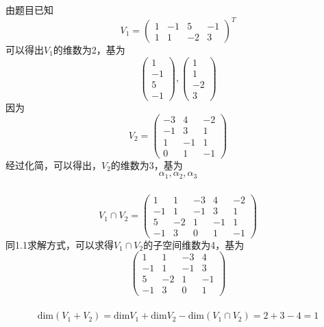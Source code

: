 \documentclass[onecolumn,oneside]{SUSTechHomework}
\begin{document}
  \subsubsection{}
  由题目已知
  \[
    V_1 = \begin{pmatrix} 1 & -1 & 5 & -1 \\ 1 & 1 & -2 & 3\end{pmatrix}^T
  \]
  可以得出\(V_1\)的维数为2，基为
  \[
    \begin{pmatrix} 1 \\ -1 \\ 5 \\ -1\end{pmatrix},
    \begin{pmatrix} 1 \\ 1 \\ -2 \\ 3\end{pmatrix}
  \]
  因为
  \[
    V_2 = \begin{pmatrix}-3 & 4 & -2 \\ -1 & 3 & 1 \\ 1 & -1 & 1 \\ 0 & 1 & -1\end{pmatrix}
  \]
  经过化简，可以得出，\(V_2\)的维数为3，基为
  \[
    \alpha_1, \alpha_2, \alpha_3
  \]

  \subsubsection{}
  \[
    V_1 \cap V_2 = \begin{pmatrix}
     1 & 1 & -3 & 4 & -2 \\ -1 & 1 & -1 & 3 & 1 \\ 5 & -2 & 1 & -1 & 1 \\ -1 & 3 & 0 & 1 & -1
    \end{pmatrix}
  \]
 同1.1求解方式，可以求得\(V_1 \cap V_2 \)的子空间维数为4，基为
 \[
  \begin{pmatrix} 1 & 1 & -3 & 4 \\ -1 & 1 & -1 & 3 \\ 5 & -2 & 1 & -1 \\ -1 & 3 & 0 & 1 \end{pmatrix}
 \]
  \subsubsection{}
  \[\text{dim}(V_1 + V_2) = \text{dim}V_1 + \text{dim}V_2 - \text{dim}(V_1 \cap V_2) = 2 + 3 - 4 = 1 \]
  
\end{document}
